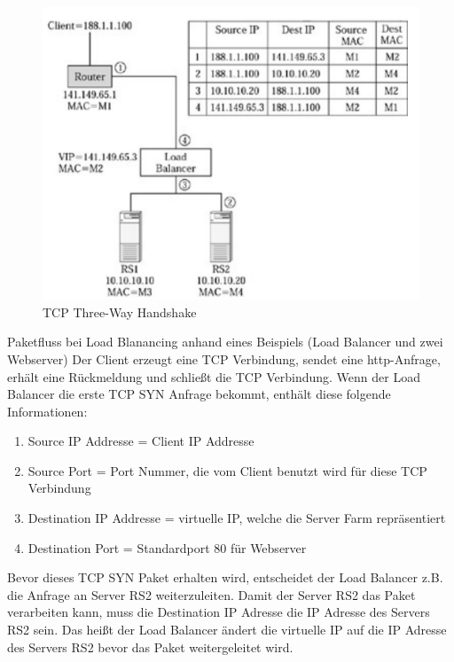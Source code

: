\pagebreak
\begin{figure}[!h]
	\begin{center}
		\includegraphics[width=0.45\linewidth]{images/loadbalancing10.jpg}
		\caption{TCP Three-Way Handshake \cite{LoadBalancing2}}
		\label{TCP Three-Way Handshake_2}
	\end{center}
\end{figure}
Paketfluss bei Load Blanancing anhand eines Beispiels (Load Balancer und zwei Webserver)
Der Client erzeugt eine TCP Verbindung, sendet eine http-Anfrage, erhält eine Rückmeldung und schließt die TCP Verbindung. Wenn der Load Balancer die erste TCP SYN Anfrage bekommt, enthält diese folgende Informationen:
\begin{enumerate}
\item Source IP Addresse = Client IP Addresse
\item Source Port = Port Nummer, die vom Client benutzt wird für diese TCP Verbindung
\item Destination IP Addresse = virtuelle IP, welche die Server Farm repräsentiert
\item Destination Port = Standardport 80 für Webserver
\end{enumerate}
Bevor dieses TCP SYN Paket erhalten wird, entscheidet der Load Balancer z.B. die Anfrage an Server RS2 weiterzuleiten. Damit der Server RS2 das Paket verarbeiten kann, muss die Destination IP Adresse die IP Adresse des Servers RS2 sein. Das heißt der Load Balancer ändert die virtuelle IP auf die IP Adresse des Servers RS2 bevor das Paket weitergeleitet wird.   
